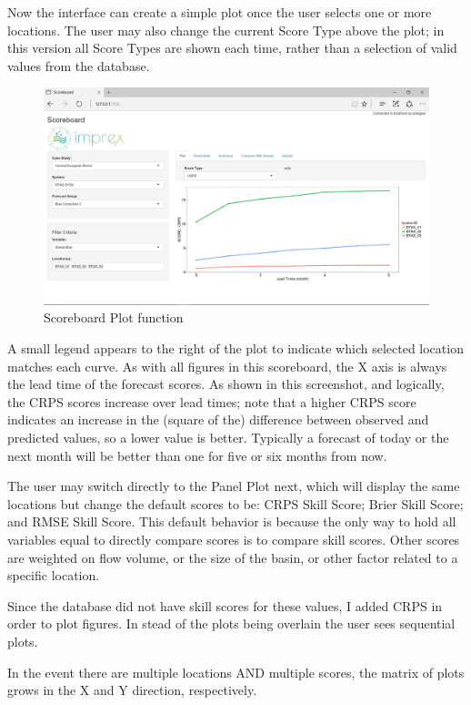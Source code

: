 \documentclass[logos,parttoc,morelanguage=french,morelanguage=german]{orsay-memoire}
\begin{document}
Now the interface can create a simple plot once the user selects one or more locations. The user may also change the current Score Type above the plot; in this version all Score Types are shown each time, rather than a selection of valid values from the database.

\begin{figure}[H]
\centering
\includegraphics[width=0.85\linewidth]{images/isb1.png}
  \caption{Scoreboard Plot function}
  \label{fig:isb1}
\end{figure}

A small legend appears to the right of the plot to indicate which selected location matches each curve. As with all figures in this scoreboard, the X axis is always the lead time of the forecast scores. As shown in this screenshot, and logically, the CRPS scores increase over lead times; note that a higher CRPS score indicates an increase in the (square of the) difference between observed and predicted values, so a lower value is better. Typically a forecast of today or the next month will be better than one for five or six months from now.

The user may switch directly to the Panel Plot next, which will display the same locations but change the default scores to be: CRPS Skill Score; Brier Skill Score; and RMSE Skill Score. This default behavior is because the only way to hold all variables equal to directly compare scores is to compare skill scores. Other scores are weighted on flow volume, or the size of the basin, or other factor related to a specific location.

Since the database did not have skill scores for these values, I added CRPS in order to plot figures. In stead of the plots being overlain the user sees sequential plots.

In the event there are multiple locations AND multiple scores, the matrix of plots grows in the X and Y direction, respectively.
\end{document}
